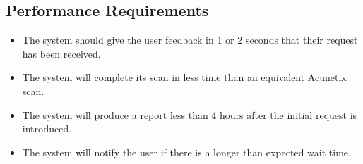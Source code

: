 \subsection{Performance Requirements}
\begin{itemize}
    \item The system should give the user feedback in 1 or 2 seconds that their request has been received.
    \item The system will complete its scan in less time than an equivalent Acunetix scan.
    \item The system will produce a report less than 4 hours after the initial request is introduced. 
    \item The system will notify the user if there is a longer than expected wait time.
\end{itemize}
